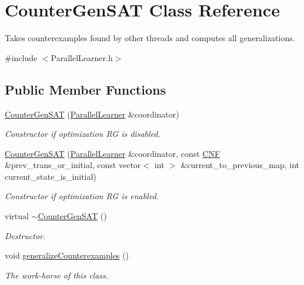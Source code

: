 \hypertarget{classCounterGenSAT}{\section{Counter\-Gen\-S\-A\-T Class Reference}
\label{classCounterGenSAT}
}


Takes counterexamples found by other threads and computes all generalizations.  




{\ttfamily \#include $<$Parallel\-Learner.\-h$>$}

\subsection*{Public Member Functions}
\begin{DoxyCompactItemize}
\item 
\hyperlink{classCounterGenSAT_ac88b310b706ed86488ca7142b4dc2748}{Counter\-Gen\-S\-A\-T} (\hyperlink{classParallelLearner}{Parallel\-Learner} \&coordinator)
\begin{DoxyCompactList}\small\item\em Constructor if optimization R\-G is disabled. \end{DoxyCompactList}\item 
\hyperlink{classCounterGenSAT_a670e3f81bd0fbb28bf5fa043561f7651}{Counter\-Gen\-S\-A\-T} (\hyperlink{classParallelLearner}{Parallel\-Learner} \&coordinator, const \hyperlink{classCNF}{C\-N\-F} \&prev\-\_\-trans\-\_\-or\-\_\-initial, const vector$<$ int $>$ \&current\-\_\-to\-\_\-previous\-\_\-map, int current\-\_\-state\-\_\-is\-\_\-initial)
\begin{DoxyCompactList}\small\item\em Constructor if optimization R\-G is enabled. \end{DoxyCompactList}\item 
virtual \hyperlink{classCounterGenSAT_abcdbdc95c437f8a66c7fe3e803cc4722}{$\sim$\-Counter\-Gen\-S\-A\-T} ()
\begin{DoxyCompactList}\small\item\em Destructor. \end{DoxyCompactList}\item 
void \hyperlink{classCounterGenSAT_af8e756f76eaa958f461a760926a46875}{generalize\-Counterexamples} ()
\begin{DoxyCompactList}\small\item\em The work-\/horse of this class. \end{DoxyCompactList}\item 

\end{DoxyCompactItemize}
